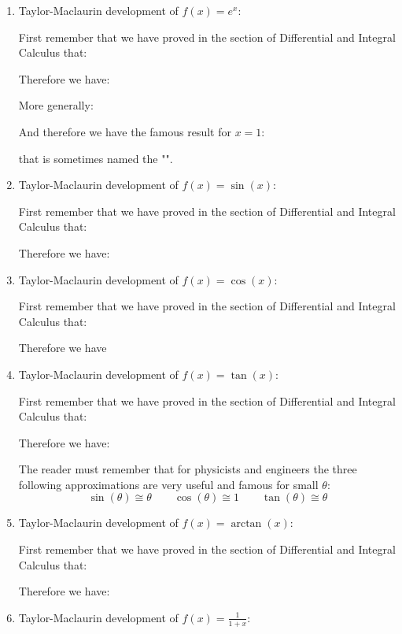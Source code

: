 	\begin{enumerate}
		\item Taylor-Maclaurin development of $f(x)=e^x$:
		
		First remember that we have proved in the section of Differential and Integral Calculus that:
		
		Therefore we have:
		
		More generally:
		
		And therefore we have the famous result for $x=1$\label{euler maclaurin expansion}:
		
		that is sometimes named the "".
		
		\item  Taylor-Maclaurin development of $f(x)=\sin(x)$:
		
		First remember that we have proved in the section of Differential and Integral Calculus that:
		
		Therefore we have:
		
		
		\item  Taylor-Maclaurin development of $f(x)=\cos(x)$:
		
		First remember that we have proved in the section of Differential and Integral Calculus that:
		
		Therefore we have\label{cosine maclaurin dev}
		
		\item  Taylor-Maclaurin development of $f(x)=\tan(x)$:
		
		First remember that we have proved in the section of Differential and Integral Calculus that:
		
		Therefore we have:
		
		
		\begin{tcolorbox}[title=Remark,colframe=black,arc=10pt]
		The reader must remember that for physicists and engineers the three following approximations are very useful and famous for small $\theta$:
		$$\sin(\theta)\cong \theta \qquad \cos(\theta)\cong 1\qquad \tan(\theta)\cong\theta$$
		\end{tcolorbox}	
		
		\item  Taylor-Maclaurin development of $f(x)=\arctan(x)$:
		
		First remember that we have proved in the section of Differential and Integral Calculus that:
		
		Therefore we have:
		
		
		\item  Taylor-Maclaurin development of $f(x)=\displaystyle\frac{1}{1+x}$:
		

\end{enumerate}
